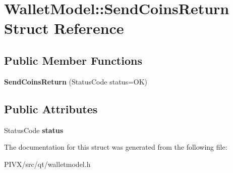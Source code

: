\hypertarget{struct_wallet_model_1_1_send_coins_return}{}\section{Wallet\+Model\+:\+:Send\+Coins\+Return Struct Reference}
\label{struct_wallet_model_1_1_send_coins_return}
\subsection*{Public Member Functions}
\begin{DoxyCompactItemize}
\item 
\mbox{\label{struct_wallet_model_1_1_send_coins_return_a90535f802fe84b050ad71db600b11fd7}} 
{\bfseries Send\+Coins\+Return} (Status\+Code status=OK)
\end{DoxyCompactItemize}
\subsection*{Public Attributes}
\begin{DoxyCompactItemize}
\item 
\mbox{\label{struct_wallet_model_1_1_send_coins_return_af7d485f3ae8e2baef7439c53c2adbd35}} 
Status\+Code {\bfseries status}
\end{DoxyCompactItemize}


The documentation for this struct was generated from the following file\+:\begin{DoxyCompactItemize}
\item 
P\+I\+V\+X/src/qt/walletmodel.\+h\end{DoxyCompactItemize}
